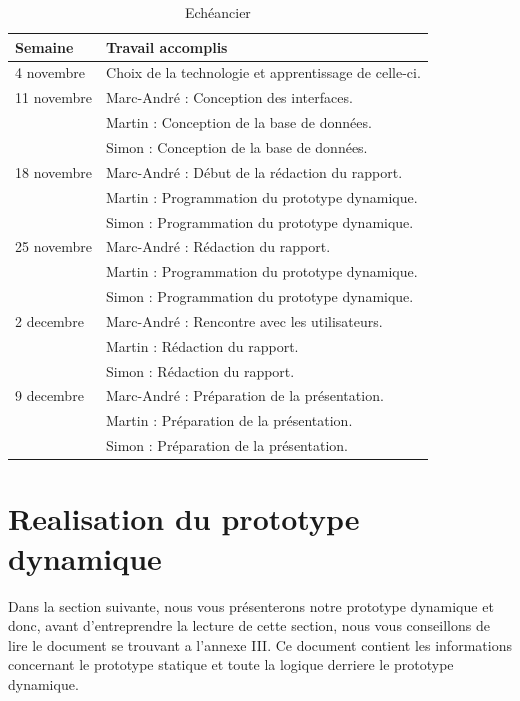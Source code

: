 \documentclass[letterpaper, oneside, 12pt, these, creativecommons]{thETS}
\begin{document}
\begin{table}
	\centering
	\begin{tabular}{|l|l|}
		\hline
		Semaine	& Travail accomplis 								\\ \hline
		4 novembre	& Choix de la technologie et apprentissage de celle-ci.		\\ \hline
		11 novembre	& Marc-André : Conception des interfaces. 				\\
				& Martin : Conception de la base de données.				\\
				& Simon : Conception de la base de données.				\\ \hline
		18 novembre	& Marc-André : Début de la rédaction du rapport. 			\\ 
				& Martin : Programmation du prototype dynamique. 			\\
				& Simon : Programmation du prototype dynamique. 			\\ \hline
		25 novembre	& Marc-André : Rédaction du rapport.		 			\\
				& Martin : Programmation du prototype dynamique. 			\\ 
				& Simon : Programmation du prototype dynamique.		 	\\ \hline
		2 decembre	& Marc-André : Rencontre avec les utilisateurs. 			\\
				& Martin : Rédaction du rapport.						\\
				& Simon : Rédaction du rapport.						\\ \hline
		9 decembre	& Marc-André : Préparation de la présentation.	 		\\ 
				& Martin : Préparation de la présentation.	 			\\ 
				& Simon : Préparation de la présentation.	 			\\ \hline
	\end{tabular}
	\caption{Echéancier}
\end{table}

\chapter{Realisation du prototype dynamique}

Dans la section suivante, nous vous présenterons notre prototype dynamique et donc, avant d'entreprendre la lecture de cette section, nous vous conseillons de lire le document se trouvant a l'annexe III. Ce document contient les informations concernant le prototype statique et toute la logique derriere le prototype dynamique.
\end{document}
